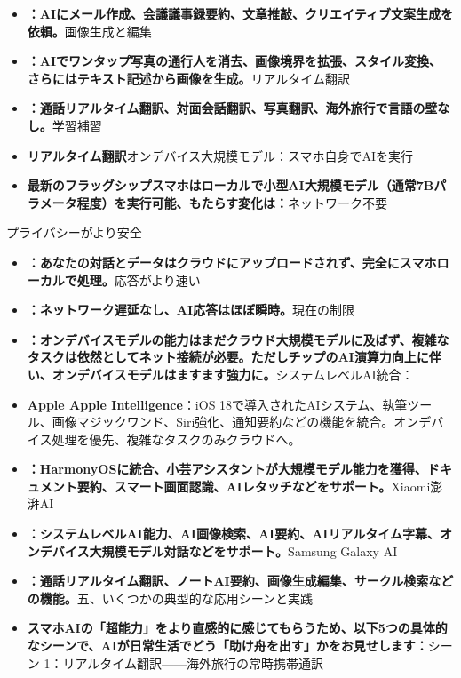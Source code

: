 \begin{itemize}
  \item \textbf{：AIにメール作成、会議議事録要約、文章推敲、クリエイティブ文案生成を依頼。}画像生成と編集
  \item \textbf{：AIでワンタップ写真の通行人を消去、画像境界を拡張、スタイル変換、さらにはテキスト記述から画像を生成。}リアルタイム翻訳
  \item \textbf{：通話リアルタイム翻訳、対面会話翻訳、写真翻訳、海外旅行で言語の壁なし。}学習補習
  \item \textbf{リアルタイム翻訳}オンデバイス大規模モデル：スマホ自身でAIを実行
  \item \textbf{最新のフラッグシップスマホはローカルで小型AI大規模モデル（通常7Bパラメータ程度）を実行可能、もたらす変化は：}ネットワーク不要
\end{itemize}


プライバシーがより安全

\begin{itemize}
  \item \textbf{：あなたの対話とデータはクラウドにアップロードされず、完全にスマホローカルで処理。}応答がより速い
  \item \textbf{：ネットワーク遅延なし、AI応答はほぼ瞬時。}現在の制限
  \item \textbf{：オンデバイスモデルの能力はまだクラウド大規模モデルに及ばず、複雑なタスクは依然としてネット接続が必要。ただしチップのAI演算力向上に伴い、オンデバイスモデルはますます強力に。}システムレベルAI統合：
  \item \textbf{Apple Apple Intelligence}：iOS 18で導入されたAIシステム、執筆ツール、画像マジックワンド、Siri強化、通知要約などの機能を統合。オンデバイス処理を優先、複雑なタスクのみクラウドへ。
\end{itemize}


\begin{itemize}
  \item \textbf{：HarmonyOSに統合、小芸アシスタントが大規模モデル能力を獲得、ドキュメント要約、スマート画面認識、AIレタッチなどをサポート。}Xiaomi澎湃AI
  \item \textbf{：システムレベルAI能力、AI画像検索、AI要約、AIリアルタイム字幕、オンデバイス大規模モデル対話などをサポート。}Samsung Galaxy AI
  \item \textbf{：通話リアルタイム翻訳、ノートAI要約、画像生成編集、サークル検索などの機能。}五、いくつかの典型的な応用シーンと実践
  \item \textbf{スマホAIの「超能力」をより直感的に感じてもらうため、以下5つの具体的なシーンで、AIが日常生活でどう「助け舟を出す」かをお見せします：}シーン 1：リアルタイム翻訳——海外旅行の常時携帯通訳
\end{itemize}

